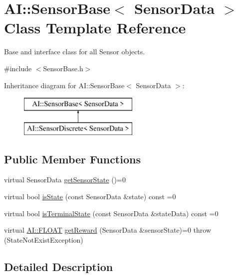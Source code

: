 \hypertarget{classAI_1_1SensorBase}{\section{A\+I\+:\+:Sensor\+Base$<$ Sensor\+Data $>$ Class Template Reference}
\label{classAI_1_1SensorBase}
}


Base and interface class for all Sensor objects.  




{\ttfamily \#include $<$Sensor\+Base.\+h$>$}

Inheritance diagram for A\+I\+:\+:Sensor\+Base$<$ Sensor\+Data $>$\+:\begin{figure}[H]
\begin{center}
\leavevmode
\includegraphics[height=2.000000cm]{classAI_1_1SensorBase}
\end{center}
\end{figure}
\subsection*{Public Member Functions}
\begin{DoxyCompactItemize}
\item 
virtual Sensor\+Data \hyperlink{classAI_1_1SensorBase_aad6f932417a7f8584c8a3f73ee096712}{get\+Sensor\+State} ()=0
\item 
virtual bool \hyperlink{classAI_1_1SensorBase_ad7a4098ecb3050be01d12b6c64fe0880}{is\+State} (const Sensor\+Data \&state) const =0
\item 
virtual bool \hyperlink{classAI_1_1SensorBase_acbfe2bd6f8bf57f01f4de881142cd437}{is\+Terminal\+State} (const Sensor\+Data \&state\+Data) const =0
\item 
virtual \hyperlink{namespaceAI_a41b74884a20833db653dded3918e05c3}{A\+I\+::\+F\+L\+O\+A\+T} \hyperlink{classAI_1_1SensorBase_a5f28a8bd01fc296860e2b04115d55f93}{get\+Reward} (Sensor\+Data \&sensor\+State)=0  throw (\+State\+Not\+Exist\+Exception)
\end{DoxyCompactItemize}


\subsection{Detailed Description}
